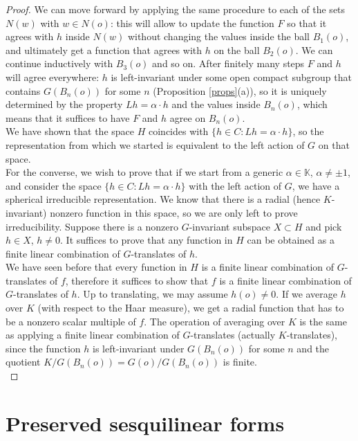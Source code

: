 \documentclass{article}
\theoremstyle{definition}
\theoremstyle{remark}
\theoremstyle{plain}
\begin{document}
\begin{proof}
We can move forward by applying the same procedure to each of the sets $N(w)$ with $w\in N(o)$: this will allow to update the function $F$ so that it agrees with $h$ inside $N(w)$ without changing the values inside the ball $B_1(o)$, and ultimately get a function that agrees with $h$ on the ball $B_2(o)$. We can continue inductively with $B_3(o)$ and so on. After finitely many steps $F$ and $h$ will agree everywhere: $h$ is left-invariant under some open compact subgroup that contains $G(B_n(o))$ for some $n$ (Proposition \ref{props}(a)), so it is uniquely determined by the property $Lh=\alpha\cdot h$ and the values inside $B_n(o)$, which means that it suffices to have $F$ and $h$ agree on $B_n(o)$. \\

We have shown that the space $H$ coincides with $\{h\in C: Lh=\alpha\cdot h\}$, so the representation from which we started is equivalent to the left action of $G$ on that space. \\

For the converse, we wish to prove that if we start from a generic $\alpha\in\mathbb{K}$, $\alpha\neq\pm 1$, and consider the space $\{h\in C: Lh=\alpha\cdot h\}$ with the left action of $G$, we have a spherical irreducible representation. We know that there is a radial (hence $K$-invariant) nonzero function in this space, so we are only left to prove irreducibility. Suppose there is a nonzero $G$-invariant subspace $X\subset H$ and pick $h\in X$, $h\neq 0$. It suffices to prove that any function in $H$ can be obtained as a finite linear combination of $G$-translates of $h$. \\

We have seen before that every function in $H$ is a finite linear combination of $G$-translates of $f$, therefore it suffices to show that $f$ is a finite linear combination of $G$-translates of $h$. Up to translating, we may assume $h(o)\neq 0$. If we average $h$ over $K$ (with respect to the Haar measure), we get a radial function that has to be a nonzero scalar multiple of $f$. The operation of averaging over $K$ is the same as applying a finite linear combination of $G$-translates (actually $K$-translates), since the function $h$ is left-invariant under $G(B_n(o))$ for some $n$ and the quotient $K/G(B_n(o))=G(o)/G(B_n(o))$ is finite. \\
\end{proof}

\section{Preserved sesquilinear forms}
\end{document}
